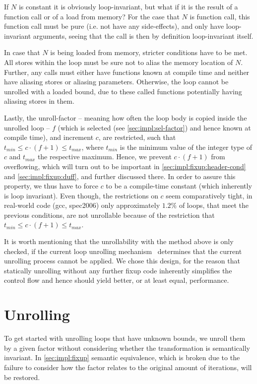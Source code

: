 If $N$ is constant it is obviously loop-invariant, but what if it is the result of a function call or of a load from memory?
For the case that $N$ is function call, this function call must be pure (i.e. not have any side-effects), and only have loop-invariant arguments, seeing that the call is then by definition loop-invariant itself.

In case that $N$ is being loaded from memory, stricter conditions have to be met.
All stores within the loop must be sure not to alias the memory location of $N$.
Further, any calls must either have functions known at compile time and neither have aliasing stores or aliasing parameters.
Otherwise, the loop cannot be unrolled with a loaded bound, due to these called functions potentially having aliasing stores in them.

Lastly, the unroll-factor -- meaning how often the loop body is copied inside the unrolled loop -- $f$ (which is selected (see \cref{sec:impl:sel-factor}) and hence known at compile time), and increment $c$, are restricted, such that $t_{min} \leq c \cdot (f+1) \leq t_{max}$, where $t_{min}$ is the minimum value of the integer type of $c$ and $t_{max}$ the respective maximum.
Hence, we prevent $c \cdot (f + 1)$ from overflowing, which will turn out to be important in \cref{sec:impl:fixup:header-cond} and \cref{sec:impl:fixup:duff}, and further discussed there.
In order to assure this property, we thus have to force $c$ to be a compile-time constant (which inherently is loop invariant).
Even though, the restrictions on $c$ seem comparatively tight, in real-world code (gcc, spec2006) only approximately $1.2\%$ of loops, that meet the previous conditions, are not unrollable because of the restriction that  $t_{min} \leq c \cdot (f+1) \leq t_{max}$.

It is worth mentioning that the unrollability with the method above is only checked, if the current loop unrolling mechanism~\cite{aebi18bachelorarbeit} determines that the current unrolling process cannot be applied.
We chose this design, for the reason that statically unrolling without any further fixup code inherently simplifies the control flow and hence should yield better, or at least equal, performance.

\section{Unrolling}\label{sec:impl:unroll}

To get started with unrolling loops that have unknown bounds, we unroll them by a given factor without considering whether the transformation is semantically invariant.
In \cref{sec:impl:fixup} semantic equivalence, which is broken due to the failure to consider how the factor relates to the original amount of iterations, will be restored.

